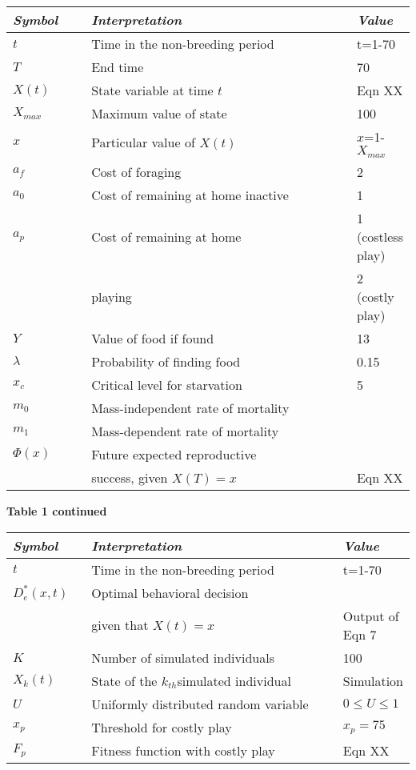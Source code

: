 \documentclass[12pt, letterpaper, fleqn]{article}
\begin{document}
\hspace*{-2cm}\begin{tabular}{p{0.2\linewidth} p{0.7\linewidth} p{0.2\linewidth}}
{\sl Symbol}	&{\sl Interpretation} 			&{\sl Value}		\\ \hline
 $t$		&Time in the non-breeding period	&t=1-70			\\ 
 $T$		&End time				&70			\\
 $X(t)$		&State variable at time $t$		&Eqn {\color{red}XX}	\\
 $X_{max}$	&Maximum value of state			&100			\\
 $x$		&Particular value of $X(t)$		&$x$=1-$X_{max}$	\\
 $a_f$		&Cost of foraging			&2			\\
 $a_0$		&Cost of remaining at home inactive	&1			\\
 $a_p$		&Cost of remaining at home		&1 (costless play)	\\
		& playing				&2 (costly play)	\\
 $Y$		&Value of food if found			&13			\\
 $\lambda$	&Probability of finding food		&0.15			\\
 $x_c$		&Critical level for starvation		&5			\\
 $m_0$		&Mass-independent rate of mortality	&			\\
 $m_1$		&Mass-dependent rate of mortality	&			\\
 $\Phi(x)$	&Future expected reproductive 		&			\\
		& success, given $X(T)=x$		&Eqn {\color{red}XX}	\\
\end{tabular}

%
\clearpage
\hspace*{-2cm}
\noindent
\textbf{Table 1 continued}
%

\hspace*{-2cm}\begin{tabular}{p{0.2\linewidth} p{0.7\linewidth} p{0.2\linewidth}}
{\sl Symbol} 	& {\sl Interpretation} 				& {\sl Value}		\\ \hline
 $t$		&Time in the non-breeding period		&t=1-70			\\ 
 $D^*_e(x,t)$	&Optimal behavioral decision			&			\\
		&given that $X(t)=x$				&Output of Eqn 7	\\
 $K$		&Number of simulated individuals		&100			\\
 $X_k(t)$	&State of the $k_{th}$simulated individual	&Simulation		\\
 $U$		&Uniformly distributed random variable		&$0 \le U \le 1$	\\
 $x_p$		&Threshold for costly play			&$x_p=75$		\\
 $F_p$		&Fitness function with costly play		& Eqn {\color{red}XX}	\\
 \end{tabular}
\end{document}
